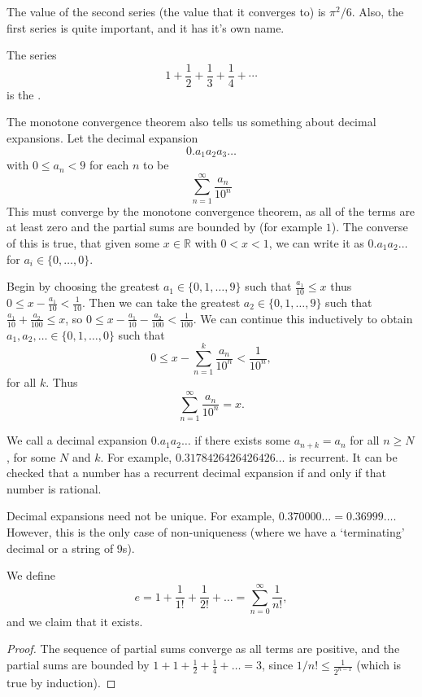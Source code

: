 \documentclass[a4paper]{scrartcl}
\begin{document}
The value of the second series (the value that it converges to) is $\pi^2 / 6$. Also, the first series is quite important, and it has it's own name.

\begin{definition}
The series
$$
1 + \frac{1}{2} + \frac{1}{3} + \frac{1}{4} + \cdots
$$
is the .
\end{definition}

The monotone convergence theorem also tells us something about decimal expansions. Let the decimal expansion
$$
0.a_1 a_2 a_3 \dots
$$
with $0 \leq a_n < 9$ for each $n$ to be 
$$
\sum_{n = 1}^\infty \frac{a_n}{10^n}
$$
This must converge by the monotone convergence theorem, as all of the terms are at least zero and the partial sums are bounded by (for example $1$).
The converse of this is true, that given some $x \in \mathbb{R}$ with $0 < x < 1$, we can write it as $0.a_1 a_2 \dots$ for $a_i \in \{0, \dots, 0\}$.

Begin by choosing the greatest $a_1 \in \{0, 1, \dots, 9\}$ such that
$
\frac{a_1}{10}\leq x
$
thus $0 \leq x - \frac{a_1}{10} < \frac{1}{10}$. Then we can take the greatest $a_2 \in \{0, 1, \dots, 9\}$ such that $\frac{a_1}{10} + \frac{a_2}{100} \leq x$, so $0 \leq x - \frac{a_1}{10} - \frac{a_2}{100} < \frac{1}{100}$. We can continue this inductively to obtain $a_1, a_2, \dots \in \{0, 1, \dots, 0\}$ such that
$$
0 \leq x - \sum_{n = 1}^k \frac{a_n}{10^n} < \frac{1}{10^n},
$$
for all $k$. Thus
$$
\sum_{n = 1}^{\infty} \frac{a_n}{10^n} = x.
$$

\begin{remark}
	We call a decimal expansion $0.a_1 a_2 \dots$  if there exists some $a_{n + k} = a_n$ for all $n \geq N$, for some $N$ and $k$. For example, $0.3178426426426426\dots$ is recurrent. It can be checked that a number has a recurrent decimal expansion if and only if that number is rational. 
\end{remark}
\begin{remark}
	Decimal expansions need not be unique. For example, $0.370000\dots = 0.36999\dots$. However, this is the only case of non-uniqueness (where we have a `terminating' decimal or a string of 9s).
\end{remark}

\begin{theorem}[$e$ Exists]
	We define
	$$
	e = 1 + \frac{1}{1!} + \frac{1}{2!} + \dots = \sum_{n = 0}^\infty \frac{1}{n!},
	$$
	and we claim that it exists.
\end{theorem}
\begin{proof}
	The sequence of partial sums converge as all terms are positive, and the partial sums are bounded by $1 + 1 + \frac{1}{2} + \frac{1}{4} + \dots = 3$, since $1/n! \leq \frac{1}{2^{n - 1}}$ (which is true by induction).
\end{proof}
\end{document}
